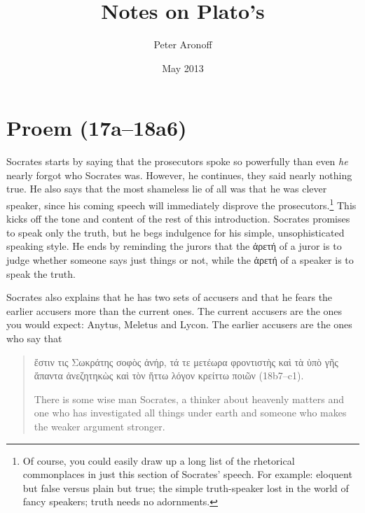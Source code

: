 \documentclass[11pt]{article}
\begin{document}
\begin{titlepage}
\title{Notes on Plato's }
\author{Peter Aronoff}
\date{May 2013}
\maketitle
\end{titlepage}


\section{Proem (17a--18a6)}

Socrates starts by saying that the prosecutors spoke so powerfully than
even \emph{he} nearly forgot who Socrates was.  However, he continues, they
said nearly nothing true.   He also says that the most shameless lie of all
was that he was clever speaker, since his coming speech will immediately
disprove the prosecutors.\footnote{Of course, you could easily draw up
a long list of the rhetorical commonplaces in just this section of Socrates'
speech.  For example: eloquent but false versus plain but true; the simple
truth-speaker lost in the world of fancy speakers; truth needs no
adornments.}  This kicks off the tone and content of the rest of this
introduction.  Socrates promises to speak only the truth, but he begs
indulgence for his simple, unsophisticated speaking style.  He ends by
reminding the jurors that the ἀρετή of a juror is to judge whether someone
says just things or not, while the ἀρετή of a speaker is to speak the
truth.

Socrates also explains that he has two sets of accusers and that he fears
the earlier accusers more than the current ones.  The current accusers are
the ones you would expect: Anytus, Meletus and Lycon.  The earlier accusers
are the ones who say that

\begin{quote}
    ἔστιν τις Σωκράτης σοφὸς ἀνήρ, τά τε μετέωρα φροντιστὴς καὶ τὰ ὑπὸ γῆς
    ἅπαντα ἀνεζητηκὼς καὶ τὸν ἥττω λόγον κρείττω ποιῶν (18b7--c1).

    There is some wise man Socrates, a thinker about heavenly matters and
    one who has investigated all things under earth and someone who makes
    the weaker argument stronger.
\end{quote}
\end{document}
